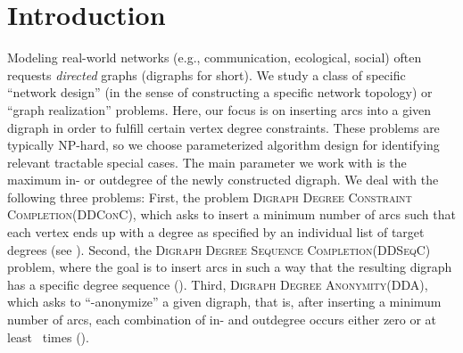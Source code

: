 \documentclass[a4paper,11pt]{article}
\theoremstyle{remark}
\theoremstyle{plain}
\theoremstyle{definition}
\newcommand{\DDCClong}{\textsc{Digraph Degree Constraint Completion}\xspace}
\newcommand{\DDCC}{\textsc{DDConC}\xspace}
\newcommand{\DDSClong}{\textsc{Digraph Degree Sequence Completion}\xspace}
\newcommand{\DDSC}{\textsc{DDSeqC}\xspace}
\newcommand{\DAlong}{\textsc{Digraph Degree Anonymity}\xspace}
\newcommand{\DA}{\textsc{DDA}\xspace}
\begin{document}
\section{Introduction}
Modeling real-world networks (e.g., communication, ecological, social) 
often requests \emph{directed} graphs (digraphs for short). 
We study a class of specific ``network design'' (in the sense of constructing
a specific network topology) or ``graph realization''
problems. Here, our focus is on inserting arcs into a given digraph in order to fulfill certain vertex degree constraints. These problems are 
typically NP-hard, so we choose parameterized algorithm design 
for identifying relevant tractable special cases. The main parameter 
we work with is the maximum in- or outdegree of the newly constructed digraph.
We deal with the following three problems:
First, the problem \DDCClong (\DDCC), which asks to insert a minimum number of arcs
such that each vertex ends up with a degree as specified by an individual list of target degrees (see ).
Second, the \DDSClong (\DDSC) problem, where the goal is to insert arcs in such a way that
the resulting digraph has a specific degree sequence ().
Third, \DAlong (\DA), which asks to ``-anonymize'' a given digraph, that is, after inserting a minimum number of arcs, each combination of in- and outdegree occurs either zero or at least ~times ().
\end{document}
